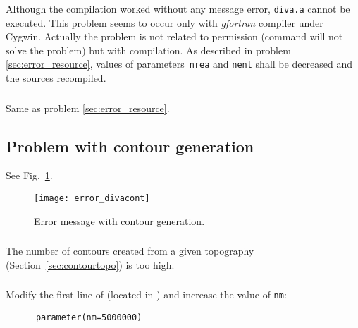 \subsubsection{\question}

Although the compilation worked without any message error, \texttt{diva.a} cannot be executed. This problem seems to occur only with \textsl{gfortran} compiler under \textsf{Cygwin}. Actually the problem is not related to permission (command  will not solve the problem) but with compilation. As described in problem \ref{sec:error_resource}, values of parameters\, \texttt{nrea} and \texttt{nent} shall be decreased and the sources recompiled.

\subsubsection{\answer}

Same as problem \ref{sec:error_resource}. 




\subsection{Problem with contour generation}

See Fig.~\ref{error:cont}.

\begin{figure}[htpb]
\centering
\texttt{[image: error\_divacont]}
\caption{Error message with contour generation.\label{error:cont}}
\end{figure}

\subsubsection{\question}

The number of contours created from a given topography (Section~\ref{sec:contourtopo}) is too high. 

\subsubsection{\answer}

Modify the first line of  (located in ) and increase the value of \texttt{nm}:
\begin{verbatim}
      parameter(nm=5000000)
\end{verbatim}

